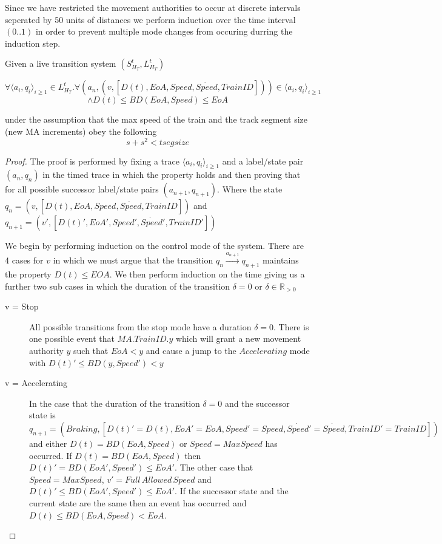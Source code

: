 Since we have restricted the movement authorities to occur at discrete intervals seperated by 50 units of distances we perform induction over the time interval $(0..1)$ in order to prevent multiple mode changes from occuring durring the induction step. 
\medskip
\begin{mytheorem}
Given a live transition system $(S^t_{H_{T}},  L^{t}_{H_T}) $

 $$\forall \langle a_i, q_i \rangle_{i \geq 1} \in L^{t}_{H_T}.  \forall (a_n, (v, [D(t), EoA,Speed,\dot{Speed},TrainID])) \in \langle a_i, q_i \rangle_{i \geq 1}$$ $$ \wedge  D(t) \leq BD(EoA,Speed)  \leq EoA$$ 

under the assumption that the max speed of the train and the track segment size (new MA increments) obey the following
                     $$s + s^2 < tsegsize$$
\begin{proof}


The proof is performed by fixing a trace $ \langle a_i, q_i \rangle_{i \geq 1}$ and  a label/state pair $(a_n, q_n)$ in the timed trace in which the property holds and then proving that for all possible successor label/state pairs $(a_{n+1},q_{n+1})$. Where  the state $q_n = (v, [D(t), EoA,Speed,\dot{Speed},TrainID])$ and $q_{n+1} = (v', [D(t)', EoA',Speed',\dot{Speed}',TrainID'])$ 

We begin by performing induction on the control mode of the system. 
There are 4 cases for $v$ in which we must argue that the transition $q_n \xrightarrow{a_{n+1}} q_{n+1}$  maintains the property $D(t) \leq EOA$. We then perform induction on the time giving us a further two sub
cases in which the duration of the transition  $\delta = 0$ or $\delta \in \mathbb{R}_{>0}$



\begin{description}
\item[v = Stop] All possible transitions from the stop mode have a duration $\delta = 0$. There is one possible event that $MA.TrainID.y$ which will grant a new movement authority $y$ such that $EoA < y$ and cause a jump to the $Accelerating$ mode with $D(t)' \leq BD(y,Speed') < y$


\item[v = Accelerating] In the case that the duration of the transition $\delta = 0$ and the successor state is $q_{n+1} = (Braking,[D(t)' = D(t), EoA' = EoA,Speed' = Speed ,\dot{Speed}' = \dot{Speed},TrainID' = TrainID])$ and either $D(t) = BD(EoA,Speed)$ or $Speed = MaxSpeed$ has occurred. If $D(t) = BD(EoA,Speed)$ then $D(t)' = BD(EoA', Speed') \leq EoA'$. The other case that $Speed = MaxSpeed$, $v' = Full \,  Allowed \, Speed$ and $D(t)' \leq BD(EoA', Speed') \leq EoA'$. If the successor state and the current state are the same then an event has occurred and $D(t) \leq BD(EoA,Speed) < EoA$.
  

\end{description}
\end{proof}
\end{mytheorem}
